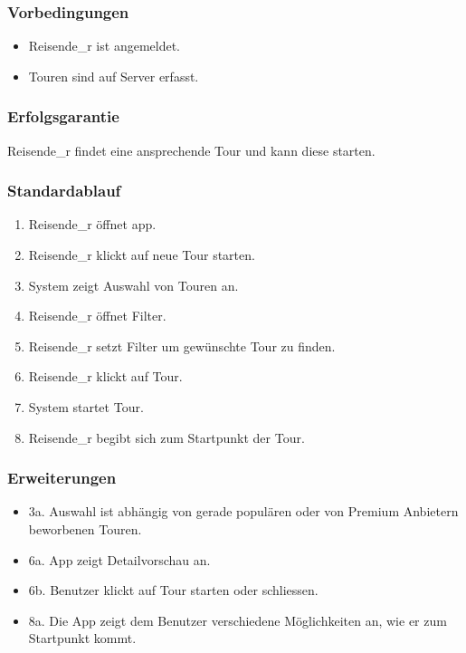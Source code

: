 \documentclass[a4paper,10pt,xetex]{article}
\begin{document}
\subsubsection{Vorbedingungen}\label{vorbedingungen}
\begin{itemize}
  \item Reisende\_r ist angemeldet.
  \item Touren sind auf Server erfasst.
\end{itemize}


\subsubsection{Erfolgsgarantie}\label{erfolgsgarantie}
Reisende\_r findet eine ansprechende Tour und kann diese starten.


\subsubsection{Standardablauf}\label{standardablauf}
\begin{enumerate}
  \item Reisende\_r öffnet app.
  \item Reisende\_r klickt auf neue Tour starten.
  \item System zeigt Auswahl von Touren an.
  \item Reisende\_r öffnet Filter.
  \item Reisende\_r setzt Filter um gewünschte Tour zu finden.
  \item Reisende\_r klickt auf Tour.
  \item System startet Tour.
  \item Reisende\_r begibt sich zum Startpunkt der Tour.
\end{enumerate}


\subsubsection{Erweiterungen}\label{erweiterungen}
\begin{itemize}
  \item 3a. Auswahl ist abhängig von gerade populären oder von Premium Anbietern beworbenen Touren.
  \item 6a. App zeigt Detailvorschau an.
  \item 6b. Benutzer klickt auf Tour starten oder schliessen.
  \item 8a. Die App zeigt dem Benutzer verschiedene Möglichkeiten an, wie er zum Startpunkt kommt.
\end{itemize}
\end{document}
